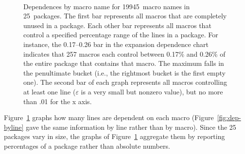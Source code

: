 \documentclass[10pt]{article}
\def\numdependpackages{25}
\def\numdependmacronames{19945}
\newcommand{\captionsmall}[1]{\caption[]{\small #1}}
\begin{document}
\begin{figure}
\centerline{%
\ %
}
\captionsmall{Dependences by macro name for \numdependmacronames\ macro
  names in \numdependpackages\ packages.  The first bar represents all
  macros that are completely unused in a package.
  Each other bar represents all macros
  that control a specified percentage range of the lines in a
  package.  For instance, the 0.17--0.26 bar in the
  expansion dependence chart indicates that 257 macros each control between
  0.17\% and 0.26\% of the entire package that contains that macro.  The
  maximum falls in the penultimate bucket (i.e., the rightmost bucket is
  the first empty one).  The second bar of each graph represents all macros
  controlling at least one line ($\varepsilon$ is a very small but nonzero
  value), but no more than .01%
  for the x axis.}

\label{fig:dep-bymacro}
\end{figure}

Figure~\ref{fig:dep-bymacro} graphs how many lines are dependent on each
macro (Figure~\ref{fig:dep-byline} gave the same information by line rather
than by macro).  Since the {\numdependpackages} packages vary in size, the
graphs of Figure~\ref{fig:dep-bymacro} aggregate them by reporting
percentages of a package rather than absolute numbers.



\end{document}
